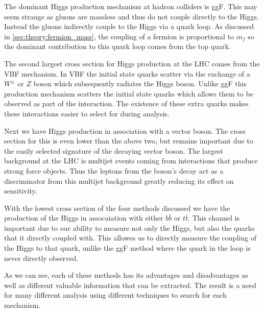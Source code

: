 The dominant Higgs production mechanism at hadron colliders is ggF.  This may
seem strange as gluons are massless and thus do not couple directly to the
Higgs.  Instead the gluons indirectly couple to the Higgs via a quark loop.  As
discussed in \cref{sec:theory:fermion_mass}, the coupling of a fermion
is proportional to $m_f$ so the dominant contribution to this quark loop comes
from the top quark.  

The second largest cross section for Higgs production at the LHC comes from the VBF
mechanism.  In VBF the initial state quarks scatter via the exchange of a
$W^{\pm}$ or $Z$ boson which subsequently radiates the Higgs boson.  Unlike ggF
this production mechanism scatters the initial state quarks which allows them to
be observed as part of the interaction.  The existence of these extra quarks
makes these interactions easier to select for during analysis.

Next we have Higgs production in association with a vector boson. The cross
section for this is even lower than the above two, but remains important due to
the easily selected signature of the decaying vector boson.  The largest
background at the LHC is multijet events coming from interactions that
produce strong force objects.  Thus the leptons from the boson's decay act as a
discriminator from this multijet background greatly reducing its effect on
sensitivity.

With the lowest cross section of the four methods discussed we have the production of
the Higgs in assocaiation with either $b\bar{b}$ or $t\bar{t}$.  This channel is
important due to our ability to measure not only the Higgs, but also the quarks
that it directly coupled with.  This allowes us to directly measure the coupling of
the Higgs to that quark, unlike the ggF method where the quark in the loop is
never directly observed.

As we can see, each of these methods has its advantages and disadvantages as
well as different valuable information that can be extracted.  The result is a
need for many different analysis using different techniques to search for each
mechanism.
